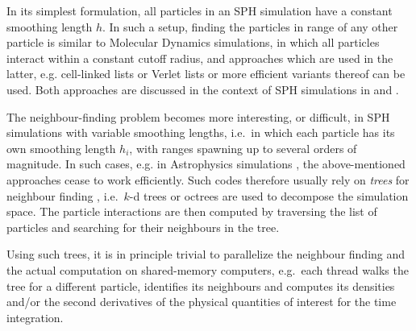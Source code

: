 \documentclass[final]{siamltex}
\begin{document}
In its simplest formulation, all particles in an SPH simulation have
a constant smoothing length $h$.
In such a setup, finding the particles in range of any other particle
is similar to Molecular Dynamics simulations, in which all particles
interact within a constant cutoff radius, and approaches which are used
in the latter, e.g. cell-linked lists
\cite{ref:Allen1989} or Verlet lists \cite{ref:Verlet1967}
or more efficient variants thereof \cite{ref:Gonnet2012,ref:Gonnet2013}
can be used.
Both approaches are discussed in the context of SPH simulations
in \cite{ref:Dominguez2011} and \cite{ref:Viccione2008}.

The neighbour-finding problem becomes more interesting, or difficult,
in SPH simulations with variable smoothing lengths, i.e.~in which
each particle has its own smoothing length $h_i$, with ranges spawning
up to several orders of magnitude.
In such cases, e.g. in Astrophysics simulations \cite{ref:Gingold1977},
the above-mentioned approaches cease to work efficiently.
Such codes therefore usually rely on {\em trees}
for neighbour finding \cite{ref:Hernquist1989,ref:Springel2005,ref:Wadsley2004},
i.e.~$k$-d trees \cite{ref:Bentley1975} or octrees \cite{ref:Meagher1982}
are used to decompose the simulation space. 
The particle interactions are then computed by traversing the list of
particles and searching for their neighbours in the tree.

Using such trees, it is in principle trivial to parallelize
the neighbour finding and the actual computation on shared-memory
computers,
e.g.~each thread walks the tree for a different particle,
identifies its neighbours and computes its densities and/or
the second derivatives of the physical quantities of interest for 
the time integration.
\end{document}
